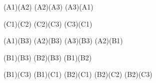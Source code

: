 


\Edge(A1)(A2)
\Edge(A2)(A3)
\Edge(A3)(A1)

\Edge(C1)(C2)
\Edge(C2)(C3)
\Edge(C3)(C1)

\Edge(A1)(B3)
\Edge(A2)(B3)
\Edge(A3)(B3)
\Edge(A2)(B1)

\Edge(B1)(B3)
\Edge(B2)(B3)
\Edge(B1)(B2)

\Edge(B1)(C3)
\Edge(B1)(C1)
\Edge(B2)(C1)
\Edge(B2)(C2)
\Edge(B2)(C3)

